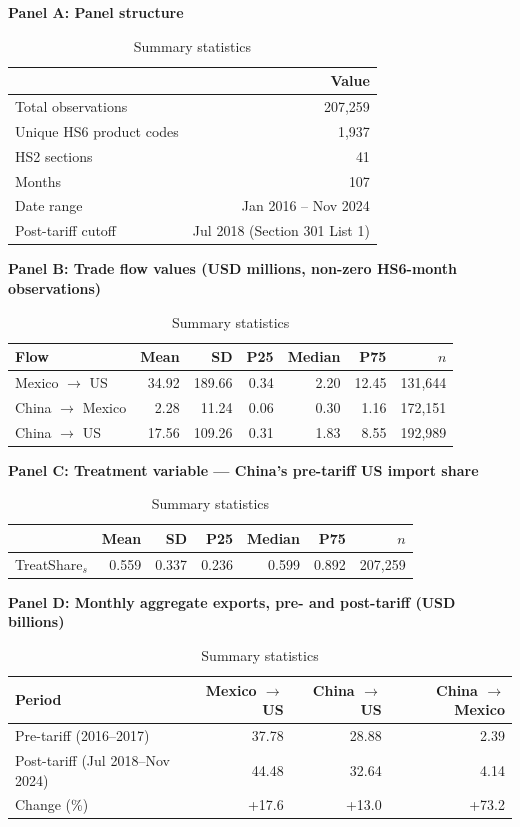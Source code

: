 \documentclass[11pt]{article}
\begin{document}
\begin{table}[tbp]
\centering
\caption{Summary statistics}
\label{tab:summary}
\begin{threeparttable}
\renewcommand{\arraystretch}{0.85}

\textbf{Panel A: Panel structure} \\[4pt]
\begin{tabular}{lr}
\toprule
                              & Value \\
\midrule
Total observations            & 207,259 \\
Unique HS6 product codes      & 1,937 \\
HS2 sections                  & 41 \\
Months                        & 107 \\
Date range                    & Jan 2016 -- Nov 2024 \\
Post-tariff cutoff            & Jul 2018 (Section 301 List 1) \\
\bottomrule
\end{tabular}

\bigskip

\textbf{Panel B: Trade flow values (USD millions, non-zero HS6-month
observations)} \\[4pt]
\begin{tabular}{lrrrrrr}
\toprule
Flow & Mean & SD & P25 & Median & P75 & $n$ \\
\midrule
Mexico $\to$ US    & 34.92 & 189.66 & 0.34 &  2.20 & 12.45 & 131,644 \\
China $\to$ Mexico &  2.28 &  11.24 & 0.06 &  0.30 &  1.16 & 172,151 \\
China $\to$ US     & 17.56 & 109.26 & 0.31 &  1.83 &  8.55 & 192,989 \\
\bottomrule
\end{tabular}

\bigskip

\textbf{Panel C: Treatment variable --- China's pre-tariff US import
share} \\[4pt]
\begin{tabular}{lrrrrrr}
\toprule
 & Mean & SD & P25 & Median & P75 & $n$ \\
\midrule
TreatShare$_s$ & 0.559 & 0.337 & 0.236 & 0.599 & 0.892 & 207,259 \\
\bottomrule
\end{tabular}

\bigskip

\textbf{Panel D: Monthly aggregate exports, pre- and post-tariff (USD
billions)} \\[4pt]
\begin{tabular}{lrrr}
\toprule
Period & Mexico $\to$ US & China $\to$ US & China $\to$ Mexico \\
\midrule
Pre-tariff (2016--2017)          & 37.78 & 28.88 & 2.39 \\
Post-tariff (Jul 2018--Nov 2024) & 44.48 & 32.64 & 4.14 \\
Change (\%)                      & +17.6 & +13.0 & +73.2 \\
\bottomrule
\end{tabular}


\end{threeparttable}
\end{table}
\end{document}
